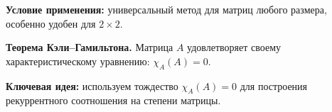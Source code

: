 \textbf{Условие применения:} универсальный метод для матриц любого размера, особенно удобен для $2 \times 2$.

\textbf{Теорема Кэли–Гамильтона.} Матрица $A$ удовлетворяет своему характеристическому уравнению: $\chi_A(A) = 0$.

\textbf{Ключевая идея:} используем тождество $\chi_A(A) = 0$ для построения рекуррентного соотношения на степени матрицы.


